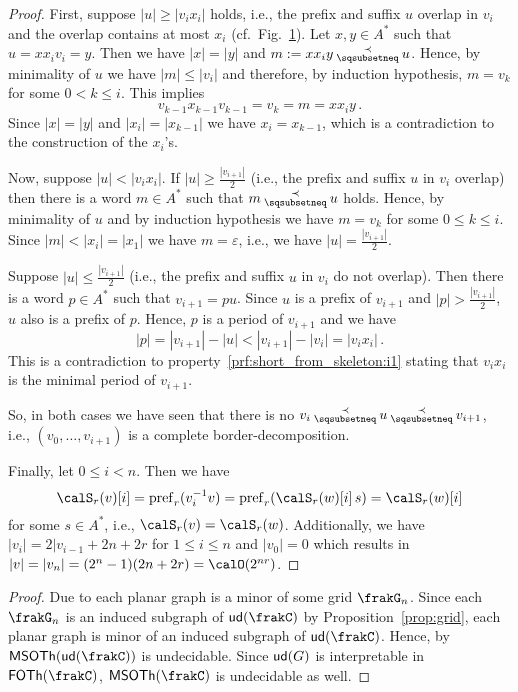 \begin{appendix}
\begin{proof}
		First, suppose $|u|\geq|v_ix_i|$ holds, i.e., the prefix and suffix $u$ overlap in $v_i$ and the overlap contains at most $x_i$ (cf.\ Fig.~\ref{fig:skeleton}). Let $x,y\in A^*$ such that $u=xx_iv_i=y$. Then we have $|x|=|y|$ and $m:=xx_iy\presuf u$. Hence, by minimality of $u$ we have $|m|\leq|v_i|$ and therefore, by induction hypothesis, $m=v_k$ for some $0< k\leq i$. This implies
		\[v_{k-1}x_{k-1}v_{k-1}=v_k=m=xx_iy\,.\]
		Since $|x|=|y|$ and $|x_i|=|x_{k-1}|$ we have $x_i=x_{k-1}$, which is a contradiction to the construction of the $x_i$'s.
		
		\begin{figure}[h]
			\centering
			\caption{\label{fig:skeleton}}
		\end{figure}
		
		Now, suppose $|u|<|v_ix_i|$. If $|u|\geq\frac{|v_{i+1}|}{2}$ (i.e., the prefix and suffix $u$ in $v_i$ overlap) then there is a word $m\in A^*$ such that $m\presuf u$ holds. Hence, by minimality of $u$ and by induction hypothesis we have $m=v_k$ for some $0\leq k\leq i$. Since $|m|<|x_i|=|x_1|$ we have $m=\varepsilon$, i.e., we have $|u|=\frac{|v_{i+1}|}{2}$.
		
		Suppose $|u|\leq\frac{|v_{i+1}|}{2}$ (i.e., the prefix and suffix $u$ in $v_i$ do not overlap). Then there is a word $p\in A^*$ such that $v_{i+1}=pu$. Since $u$ is a prefix of $v_{i+1}$ and $|p|>\frac{|v_{i+1}|}{2}$, $u$ also is a prefix of $p$. Hence, $p$ is a period of $v_{i+1}$ and we have
		\[|p|=|v_{i+1}|-|u|<|v_{i+1}|-|v_i|=|v_ix_i|\,.\]
		This is a contradiction to property~\ref{prf:short_from_skeleton:i1} stating that $v_ix_i$ is the minimal period of $v_{i+1}$.
		
		So, in both cases we have seen that there is no $v_i\presuf u\presuf v_{i+1}$, i.e., $(v_0,\dots,v_{i+1})$ is a complete border-decomposition.
		
			Finally, let $0\leq i<n$. Then we have
		\[\calS_r(v)[i]=\pref_r(\inv{v_i}v)=\pref_r(\calS_r(w)[i]\,s)=\calS_r(w)[i]\]
		for some $s\in A^*$, i.e., $\calS_r(v)=\calS_r(w)$. Additionally, we have $|v_i|=2|v_{i-1}+2n+2r$ for $1\leq i\leq n$ and $|v_0|=0$ which results in $|v|=|v_n|=(2^n-1)(2n+2r)=\calO(2^{nr})$.
	\end{proof}
	
	\msoth*
	\begin{proof}
		Due to \cite{RobS84} each planar graph is a minor of some grid $\frakG_n$. Since each $\frakG_n$ is an induced subgraph of $\ud{\cQ}$ by Proposition~\ref{prop:grid}, each planar graph is minor of an induced subgraph of $\ud{\cQ}$. Hence, by \cite[Theorem~5]{See91} $\MSOTh{\ud{\cQ}}$ is undecidable. Since $\mathsf{ud}(G)$ is interpretable in $\FOTh{\cQ}$, $\MSOTh{\cQ}$ is undecidable as well.
	\end{proof}


\end{appendix}
